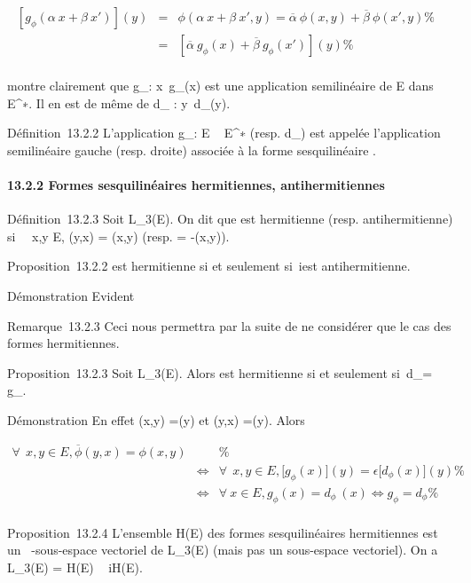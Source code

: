 \documentclass[]{article}
\begin{document}
\begin{align*} \left
[g_\phi(\alpha~x + \beta~x')\right ](y)& =& \phi(\alpha~x +
\beta~x',y) = \overline\alpha~\phi(x,y) +
\overline\beta~\phi(x',y)\%&
\\ & =& \left
[\overline\alpha~g_\phi(x) +
\overline\beta~g_\phi(x')\right
](y) \%& \\
\end{align*}

montre clairement que g_\phi :
x\mapsto~g_\phi(x) est une application
semilinéaire de E dans E^∗. Il en est de même de d_\phi
: y\mapsto~d_\phi(y).

Définition~13.2.2 L'application g_\phi : E \rightarrow~ E^∗ (resp.
d_\phi) est appelée l'application semilinéaire gauche (resp.
droite) associée à la forme sesquilinéaire \phi.

\paragraph{13.2.2 Formes sesquilinéaires hermitiennes, antihermitiennes}

Définition~13.2.3 Soit \phi \in L_3(E). On dit que \phi est
hermitienne (resp. antihermitienne) si \forall~~x,y \in
E, \phi(y,x) = \overline\phi(x,y) (resp. =
-\overline\phi(x,y)).

Proposition~13.2.2 \phi est hermitienne si et seulement si~i\phi est
antihermitienne.

Démonstration Evident

Remarque~13.2.3 Ceci nous permettra par la suite de ne considérer que le
cas des formes hermitiennes.

Proposition~13.2.3 Soit \phi \in L_3(E). Alors \phi est hermitienne
si et seulement si~d_\phi = g_\phi.

Démonstration En effet \phi(x,y) =(y) et
\overline\phi(y,x) =(y). Alors

\begin{align*} \forall~~x,y \in E,
\overline\phi(y,x) = \phi(x,y)&& \%&
\\ & \Leftrightarrow &
\forall~~x,y \in E, \big
[g_\phi(x)\big ](y) = \epsilon\big
[d_\phi(x)\big ](y)\%&
\\ & \Leftrightarrow &
\forall~x \in E, g_\phi(x) = d_\phi~(x)
\Leftrightarrow g_\phi = d_\phi \%&
\\ \end{align*}

Proposition~13.2.4 L'ensemble H(E) des formes sesquilinéaires
hermitiennes est un ~-sous-espace vectoriel de L_3(E) (mais
pas un  sous-espace vectoriel). On a L_3(E) = H(E) \oplus~ iH(E).
\end{document}
